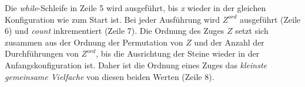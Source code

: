 \documentclass[12pt,a4paper, usenames, dvipsnames]{article}
\theoremstyle{mystyle}
\theoremstyle{definition}
\begin{document}
Die \textit{while}-Schleife in Zeile 5 wird ausgeführt, bis \textit{x} wieder in der gleichen Konfiguration wie zum Start ist. Bei jeder Ausführung wird $Z^\textit{ord}$ ausgeführt (Zeile 6) und \textit{count} inkrementiert (Zeile 7).
Die Ordnung des Zuges $Z$ setzt sich zusammen aus der Ordnung der Permutation von $Z$ und der Anzahl der Durchführungen von $Z^\textit{ord}$, bis die Ausrichtung der Steine wieder in der Anfangskonfiguration ist. Daher ist die Ordnung eines Zuges das \textit{kleinste gemeinsame Vielfache} von diesen beiden Werten (Zeile 8).



%
%
%
%
%
%
%
%
%
%
%
%
%
%
%
%
%
%
%
%



%
%
%
%
%
%
%
%
%
%
%
%
%
%
%
%
%
%
%
%
\newpage
\end{document}
